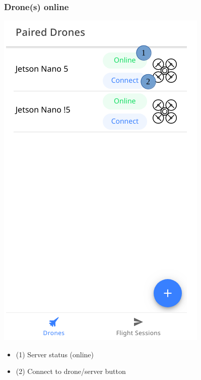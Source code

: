 \newpage
\subsubsection{Drone(s) online}
\begin{minipage}[c]{0.5\linewidth}
	\centering
	\includegraphics[scale=0.4]{./assets/images/online.png}
	\label{fig: mainPageOnline}
\end{minipage}
\begin{minipage}[c]{0.5\linewidth}
	\begin{itemize}
			\item (1) Server status (online)
			\item (2) Connect to drone/server button
	\end{itemize}
\end{minipage}


